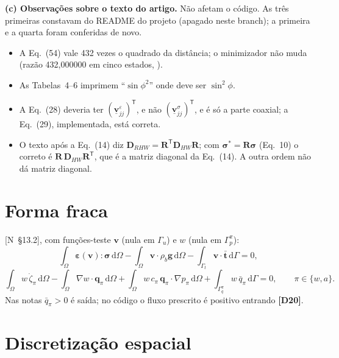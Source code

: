 \documentclass[11pt,a4paper]{article}
\numberwithin{equation}{section}
\newcommand{\dd}{\mathrm{d}}
\newcommand{\eps}{\boldsymbol\varepsilon}
\newcommand{\sig}{\boldsymbol\sigma}
\newcommand{\nota}[1]{{\footnotesize\textsf{[N~#1]}}}
\newcommand{\disc}[1]{\textcolor{red!70!black}{\textbf{\footnotesize[#1]}}}
\begin{document}
\textbf{(c) Observações sobre o texto do artigo.} Não afetam o código. As três primeiras constavam do README do projeto
 (apagado neste branch); a primeira e a quarta foram conferidas de novo.
\begin{itemize}
\item A Eq.~(54) vale 432 vezes o quadrado da distância; o minimizador não muda (razão 432,000000 em cinco estados,
).
\item As Tabelas~4--6 imprimem ``$\sin\phi^2$'' onde deve ser $\sin^2\phi$.
\item A Eq.~(28) deveria ter $(\underline{\mathbf v}^{\varepsilon}_{jj})^{\mathsf T}$, e não
$(\underline{\mathbf v}^{\sigma}_{jj})^{\mathsf T}$, e é só a parte coaxial; a Eq.~(29), implementada, está correta.
\item O texto após a Eq.~(14) diz $\mathbf D_{RHW}=\mathbf R^{\mathsf T}\mathbf D_{HW}\mathbf R$; com
$\sig^*=\mathbf R\sig$ (Eq.~10) o correto é $\mathbf R\,\mathbf D_{HW}\mathbf R^{\mathsf T}$, que é a matriz diagonal da
Eq.~(14). A outra ordem não dá matriz diagonal.
\end{itemize}

\section{Forma fraca}\label{sec:fraca}

\nota{§13.2}, com funções-teste $\mathbf v$ (nula em $\Gamma_u$) e $w$ (nula em $\Gamma_p^\pi$):
\begin{equation}
\int_\Omega\eps(\mathbf v):\sig\,\dd\Omega-\int_\Omega\mathbf v\cdot\rho_b\mathbf g\,\dd\Omega
-\int_{\Gamma_t}\mathbf v\cdot\bar{\mathbf t}\,\dd\Gamma=0,
\label{eq:fracau}
\end{equation}
\begin{equation}
\int_\Omega w\,\dot\zeta_\pi\,\dd\Omega-\int_\Omega\nabla w\cdot\mathbf q_\pi\,\dd\Omega
+\int_\Omega w\,c_\pi\,\mathbf q_\pi\cdot\nabla p_\pi\,\dd\Omega+\int_{\Gamma^\pi_q}w\,\bar q_\pi\,\dd\Gamma=0,
\qquad\pi\in\{w,a\}.
\label{eq:fracap}
\end{equation}
Nas notas $\bar q_\pi>0$ é saída; no código o fluxo prescrito é positivo entrando \disc{D20}.

\section{Discretização espacial}\label{sec:espacial}
\end{document}
